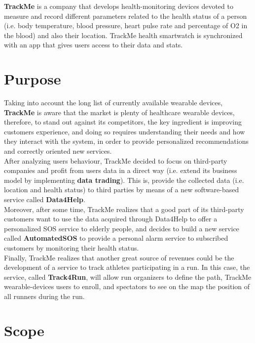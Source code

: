 \documentclass[12pt]{report}
\begin{document}
\textbf{TrackMe} is a company that develops health-monitoring devices devoted to measure and record different parameters related to the health status of a person (i.e. body temperature, blood pressure, heart pulse rate and percentage of O2 in the blood) and also their location. TrackMe health smartwatch is synchronized with an app that gives users access to their data and stats.  

\section{Purpose}
Taking into account the long list of currently available wearable devices, \textbf{TrackMe}  is aware that the market is plenty of healthcare wearable devices, therefore, to stand out against its competitors, the key ingredient is improving customers experience, and doing so requires understanding their needs and how they interact with the system, in order to provide personalized recommendations and correctly oriented new services. \\

After analyzing users behaviour, TrackMe decided to focus on third-party companies and profit from users data in a direct way (i.e. extend its business model by implementing \textbf{data trading}). This is, provide the collected data (i.e. location and health status) to third parties by means of a new software-based service called \textbf{Data4Help}. \\

Moreover, after some time, TrackMe realizes that a good part of its third-party customers want to use the data acquired through Data4Help to offer a personalized SOS service to elderly people, and decides to build a new service called \textbf{AutomatedSOS} to provide a personal alarm service to subscribed customers by monitoring their health status. \\

Finally, TrackMe realizes that another great source of revenues could be the development of a service to track athletes participating in a run. In this case, the service, called \textbf{Track4Run}, will allow run organizers to define the path, TrackMe wearable-devices users to enroll, and spectators to see on the map the position of all runners during the run. \\

\section{Scope}
\end{document}
